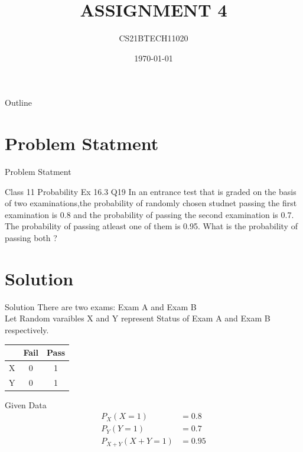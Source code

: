\documentclass{beamer}
\title{ASSIGNMENT 4}
\author{CS21BTECH11020}
\date{\today}
\begin{document}
\begin{frame}
    \titlepage 
\end{frame}

\logo{}


\begin{frame}{Outline}
    \tableofcontents
\end{frame}


\section{Problem Statment}

\begin{frame}{Problem Statment}
    \begin{block}{Class 11 Probability Ex 16.3 Q19}
        In an entrance test that is graded on the basis of two examinations,the probability of randomly chosen studnet passing the first examination is 0.8 and the probability of passing the second examination is 0.7. The probability of passing atleast one of them is 0.95. What is the probability of passing both ?    
    \end{block}
\end{frame}

\section{Solution}

\begin{frame}{Solution}
    There are two exams: Exam A and Exam B \\
    Let Random varaibles X and Y represent Status of Exam A and Exam B respectively.\\
    \begin{table}
        \begin{tabular}{|c|c|c|}
            \hline
            & Fail & Pass \\
            \hline
            X & 0 & 1 \\
            \hline
            Y & 0 & 1 \\
            \hline
        \end{tabular}
    \end{table}
    \begin{block}{Given Data}
        \begin{align}
            P_X(X = 1) &= 0.8 \label{eq:1}\\
            P_Y(Y = 1) &= 0.7 \label{eq:2}\\
            P_{X+Y}(X+Y = 1) &= 0.95 \label{eq:3}
        \end{align}
    \end{block}
\end{frame}
\end{document}
